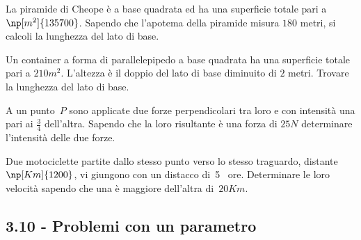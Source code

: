 \begin{multicols}{2}
\begin{esercizio}[\Ast]
 \label{ese:3.166}
La piramide di Cheope è a base quadrata ed ha una superficie totale pari a
$\np[m^2]{135700}$. Sapendo che l'apotema della piramide misura $ 180 $ metri, si
calcoli la lunghezza del lato di base.
\end{esercizio}

\begin{esercizio}[\Ast]
 \label{ese:3.167}
Un container a forma di parallelepipedo a base quadrata ha una superficie
totale pari a $ 210\unit{m^2} $. L'altezza è il doppio del lato di base diminuito di
$ 2 $ metri. Trovare la lunghezza del lato di base.
\end{esercizio}

\begin{esercizio}[\Ast] %
 \label{ese:3.168}
A un punto~$P$ sono applicate due forze perpendicolari tra loro e con intensità una pari ai $\frac{3}{4}$ dell'altra. Sapendo che la loro risultante è una forza di $25\unit{N}$ determinare l'intensità delle due forze.
\end{esercizio}

\begin{esercizio}[\Ast] %
 \label{ese:3.169}
Due motociclette partite dallo stesso punto verso lo stesso traguardo, distante $\np[Km]{1200}$, vi giungono con un distacco di~5~ ore. Determinare le loro velocità sapendo che una è maggiore dell'altra di~$20\unit{Km}$.
\end{esercizio}
\pagebreak
\subsection*{3.10 - Problemi con un parametro}


\end{multicols}
